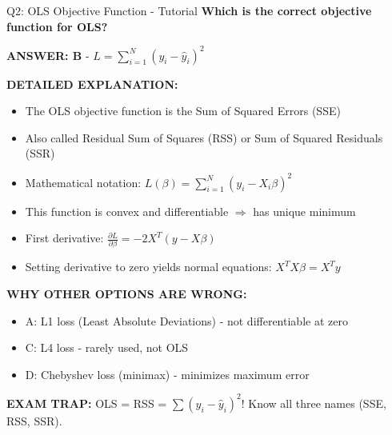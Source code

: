 \documentclass[8pt]{beamer}
\begin{document}
	\begin{frame}{Q2: OLS Objective Function - Tutorial}
		\fontsize{6.5}{7.5}\selectfont
		\textbf{Which is the correct objective function for OLS?}
		
		\vspace{0.05cm}
		\textcolor{myblue}{\textbf{ANSWER: B}} - $L = \sum_{i=1}^N (y_i - \hat{y}_i)^2$
		
		\vspace{0.05cm}
		\textbf{DETAILED EXPLANATION:}
		\begin{itemize}
			\item The OLS objective function is the Sum of Squared Errors (SSE)
			\item Also called Residual Sum of Squares (RSS) or Sum of Squared Residuals (SSR)
			\item Mathematical notation: $L(\beta) = \sum_{i=1}^N (y_i - X_i\beta)^2$
			\item This function is convex and differentiable $\Rightarrow$ has unique minimum
			\item First derivative: $\frac{\partial L}{\partial \beta} = -2X^T(y - X\beta)$
			\item Setting derivative to zero yields normal equations: $X^TX\beta = X^Ty$
		\end{itemize}
		
		\vspace{0.05cm}
		\textcolor{myred}{\textbf{WHY OTHER OPTIONS ARE WRONG:}}
		\begin{itemize}
			\item \textcolor{myred}{A:} L1 loss (Least Absolute Deviations) - not differentiable at zero
			\item \textcolor{myred}{C:} L4 loss - rarely used, not OLS
			\item \textcolor{myred}{D:} Chebyshev loss (minimax) - minimizes maximum error
		\end{itemize}
		
		\textcolor{myred}{\textbf{EXAM TRAP:}} OLS = \textcolor{myblue}{RSS} = $\sum (y_i - \hat{y}_i)^2$! Know all three names (SSE, RSS, SSR).
	\end{frame}
	
\end{document}

